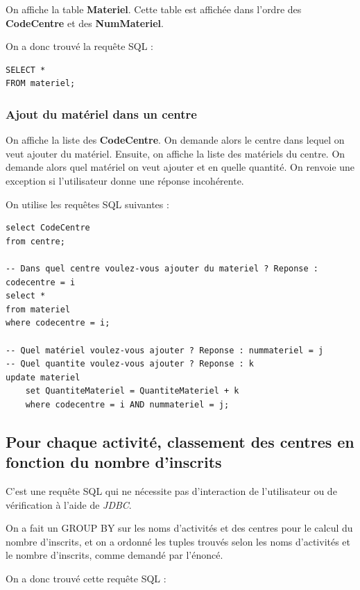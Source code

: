 \documentclass[10pt]{article}
\begin{document}
On affiche la table \textbf{Materiel}. Cette table est affichée dans l'ordre des \textbf{CodeCentre} et des \textbf{NumMateriel}.

On a donc trouvé la requête SQL :
\begin{small}
\begin{verbatim}
SELECT *
FROM materiel;
\end{verbatim}
\end{small}

\subsubsection{Ajout du matériel dans un centre}

On affiche la liste des \textbf{CodeCentre}. On demande alors le centre dans lequel on veut ajouter du matériel. Ensuite,
on affiche la liste des matériels du centre. On demande alors quel matériel on veut ajouter et en quelle quantité. On renvoie une exception si l'utilisateur donne une réponse incohérente.

On utilise les requêtes SQL suivantes :

\begin{small}
\begin{verbatim}
select CodeCentre
from centre;

-- Dans quel centre voulez-vous ajouter du materiel ? Reponse : codecentre = i
select *
from materiel 
where codecentre = i;

-- Quel matériel voulez-vous ajouter ? Reponse : nummateriel = j
-- Quel quantite voulez-vous ajouter ? Reponse : k
update materiel
	set QuantiteMateriel = QuantiteMateriel + k
	where codecentre = i AND nummateriel = j;
\end{verbatim}
\end{small}

\subsection{Pour chaque activité, classement des centres en fonction du nombre d'inscrits}

C'est une requête SQL qui ne nécessite pas d'interaction de l'utilisateur ou de vérification à l'aide de \emph{JDBC}. 

On a fait un GROUP BY sur les noms d'activités et des centres pour le calcul du nombre d'inscrits, et on a ordonné les tuples trouvés 
selon les noms d'activités et le nombre d'inscrits, comme demandé par l'énoncé.

On a donc trouvé cette requête SQL :
\end{document}
